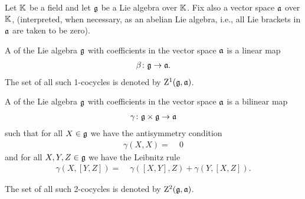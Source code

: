 
Let $\mathbb{K}$ be a field and let $\mathfrak{g}$ be a Lie algebra over $\mathbb{K}$.
Fix also a vector space $\mathfrak{a}$ over $\mathbb{K}$, (interpreted, when necessary,
as an abelian Lie algebra, i.e., all Lie brackets in $\mathfrak{a}$ are taken to
be zero).

\begin{definition}
  \label{def:LieOneCocycle}
  \leanok
  A  of the Lie algebra $\mathfrak{g}$ with coefficients in the vector
  space $\mathfrak{a}$ is a linear map
  \begin{align*}
    \beta \colon \mathfrak{g} \to \mathfrak{a} .
  \end{align*}
  The set of all such 1-cocycles is denoted by $\mathrm{Z}^1(\mathfrak{g}, \mathfrak{a})$.
\end{definition}

\begin{definition}
  \label{def:LieTwoCocycle}
  \leanok
  A  of the Lie algebra $\mathfrak{g}$ with coefficients in the vector
  space $\mathfrak{a}$ is a bilinear map
  \begin{align*}
    \gamma \colon \mathfrak{g} \times \mathfrak{g} \to \mathfrak{a}
  \end{align*}
  such that for all $X \in \mathfrak{g}$ we have the antisymmetry condition
  \begin{align}\label{eq:LieTwoCocycle.self}
    \gamma(X,X) = \; & 0
  \end{align}
  and for all $X,Y,Z \in \mathfrak{g}$ we have the Leibnitz rule
  \begin{align}\label{eq:LieTwoCocycle.leibniz}
    \gamma(X,[Y,Z]) = \; & \gamma([X,Y],Z) + \gamma(Y,[X,Z]) .
  \end{align}

  The set of all such 2-cocycles is denoted by $\mathrm{Z}^2(\mathfrak{g}, \mathfrak{a})$.
\end{definition}

